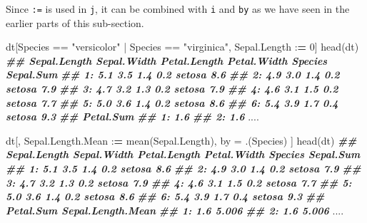 \documentclass[
]{book}
\newenvironment{Shaded}{\begin{snugshade}}{\end{snugshade}}
\newcommand{\DecValTok}[1]{\textcolor[rgb]{0.00,0.00,0.81}{#1}}
\newcommand{\DocumentationTok}[1]{\textcolor[rgb]{0.56,0.35,0.01}{\textbf{\textit{#1}}}}
\newcommand{\ErrorTok}[1]{\textcolor[rgb]{0.64,0.00,0.00}{\textbf{#1}}}
\newcommand{\FunctionTok}[1]{\textcolor[rgb]{0.00,0.00,0.00}{#1}}
\newcommand{\NormalTok}[1]{#1}
\newcommand{\OtherTok}[1]{\textcolor[rgb]{0.56,0.35,0.01}{#1}}
\newcommand{\SpecialCharTok}[1]{\textcolor[rgb]{0.00,0.00,0.00}{#1}}
\newcommand{\StringTok}[1]{\textcolor[rgb]{0.31,0.60,0.02}{#1}}
\begin{document}
Since \texttt{:=} is used in \texttt{j}, it can be combined with \texttt{i} and \texttt{by} as we have seen in the earlier parts of this sub-section.

\begin{Shaded}
\begin{Highlighting}[]

\NormalTok{dt[Species }\SpecialCharTok{==} \StringTok{"versicolor"} \SpecialCharTok{|}\NormalTok{ Species }\SpecialCharTok{==} \StringTok{"virginica"}\NormalTok{, Sepal.Length }\SpecialCharTok{:}\ErrorTok{=} \DecValTok{0}\NormalTok{]}
\FunctionTok{head}\NormalTok{(dt)}
\DocumentationTok{\#\#    Sepal.Length Sepal.Width Petal.Length Petal.Width Species Sepal.Sum}
\DocumentationTok{\#\# 1:          5.1         3.5          1.4         0.2  setosa       8.6}
\DocumentationTok{\#\# 2:          4.9         3.0          1.4         0.2  setosa       7.9}
\DocumentationTok{\#\# 3:          4.7         3.2          1.3         0.2  setosa       7.9}
\DocumentationTok{\#\# 4:          4.6         3.1          1.5         0.2  setosa       7.7}
\DocumentationTok{\#\# 5:          5.0         3.6          1.4         0.2  setosa       8.6}
\DocumentationTok{\#\# 6:          5.4         3.9          1.7         0.4  setosa       9.3}
\DocumentationTok{\#\#    Petal.Sum}
\DocumentationTok{\#\# 1:       1.6}
\DocumentationTok{\#\# 2:       1.6}
\NormalTok{....}

\NormalTok{dt[, Sepal.Length.Mean }\SpecialCharTok{:}\ErrorTok{=} \FunctionTok{mean}\NormalTok{(Sepal.Length),}
\NormalTok{  by }\OtherTok{=}\NormalTok{ .(Species)}
\NormalTok{]}
\FunctionTok{head}\NormalTok{(dt)}
\DocumentationTok{\#\#    Sepal.Length Sepal.Width Petal.Length Petal.Width Species Sepal.Sum}
\DocumentationTok{\#\# 1:          5.1         3.5          1.4         0.2  setosa       8.6}
\DocumentationTok{\#\# 2:          4.9         3.0          1.4         0.2  setosa       7.9}
\DocumentationTok{\#\# 3:          4.7         3.2          1.3         0.2  setosa       7.9}
\DocumentationTok{\#\# 4:          4.6         3.1          1.5         0.2  setosa       7.7}
\DocumentationTok{\#\# 5:          5.0         3.6          1.4         0.2  setosa       8.6}
\DocumentationTok{\#\# 6:          5.4         3.9          1.7         0.4  setosa       9.3}
\DocumentationTok{\#\#    Petal.Sum Sepal.Length.Mean}
\DocumentationTok{\#\# 1:       1.6             5.006}
\DocumentationTok{\#\# 2:       1.6             5.006}
\NormalTok{....}
\end{Highlighting}
\end{Shaded}
\end{document}
